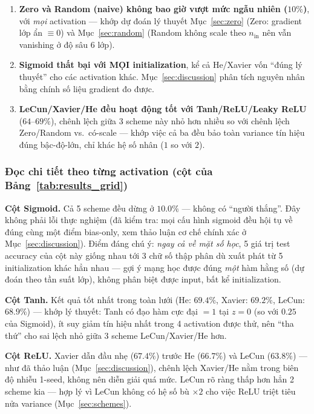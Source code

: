 \documentclass[12pt,a4paper]{article}
\begin{document}
\begin{enumerate}
\item \textbf{Zero và Random (naive) không bao giờ vượt mức ngẫu nhiên
  ($10\%$)}, với \emph{mọi} activation --- khớp dự đoán lý thuyết
  Mục~\ref{sec:zero} (Zero: gradient lớp ẩn $\equiv0$) và Mục~\ref{sec:random} (Random
  không scale theo $n_{\text{in}}$ nên vẫn vanishing ở độ sâu 6 lớp).
\item \textbf{Sigmoid thất bại với MỌI initialization}, kể cả He/Xavier
  vốn ``đúng lý thuyết'' cho các activation khác. Mục~\ref{sec:discussion}
  phân tích nguyên nhân bằng chính số liệu gradient đo được.
\item \textbf{LeCun/Xavier/He đều hoạt động tốt với Tanh/ReLU/Leaky ReLU}
  ($64$--$69\%$), chênh lệch giữa 3 scheme này nhỏ hơn nhiều so với chênh
  lệch Zero/Random vs.\ có-scale --- khớp việc cả ba đều bảo toàn variance
  tín hiệu đúng bậc-độ-lớn, chỉ khác hệ số nhân ($1$ so với $2$).
\end{enumerate}

\subsubsection*{Đọc chi tiết theo từng activation (cột của Bảng~\ref{tab:results_grid})}

\textbf{Cột Sigmoid.} Cả 5 scheme đều dừng ở $10.0\%$ --- không có ``người
thắng''. Đây không phải lỗi thực nghiệm (đã kiểm tra: mọi cấu hình sigmoid
đều hội tụ về đúng cùng một điểm bias-only, xem thảo luận cơ chế chính
xác ở Mục~\ref{sec:discussion}). Điểm đáng chú ý: \emph{ngay cả về mặt
số học}, 5 giá trị test accuracy của cột này giống nhau tới 3 chữ số thập
phân dù xuất phát từ 5 initialization khác hẳn nhau --- gợi ý mạng học
được đúng \emph{một} hàm hằng số (dự đoán theo tần suất lớp), không phân
biệt được input, bất kể initialization.

\textbf{Cột Tanh.} Kết quả tốt nhất trong toàn lưới (He: $69.4\%$,
Xavier: $69.2\%$, LeCun: $68.9\%$) --- khớp lý thuyết: Tanh có đạo hàm
cực đại $=1$ tại $z=0$ (so với $0.25$ của Sigmoid), ít suy giảm tín hiệu
nhất trong 4 activation được thử, nên ``tha thứ'' cho sai lệch nhỏ giữa 3
scheme LeCun/Xavier/He hơn.

\textbf{Cột ReLU.} Xavier dẫn đầu nhẹ ($67.4\%$) trước He ($66.7\%$)
và LeCun ($63.8\%$) --- như đã thảo luận (Mục~\ref{sec:discussion}),
chênh lệch Xavier/He nằm trong biên độ nhiễu 1-seed, không nên diễn giải
quá mức. LeCun rõ ràng thấp hơn hẳn 2 scheme kia --- hợp lý vì LeCun
không có hệ số bù $\times2$ cho việc ReLU triệt tiêu nửa variance
(Mục~\ref{sec:schemes}).
\end{document}
